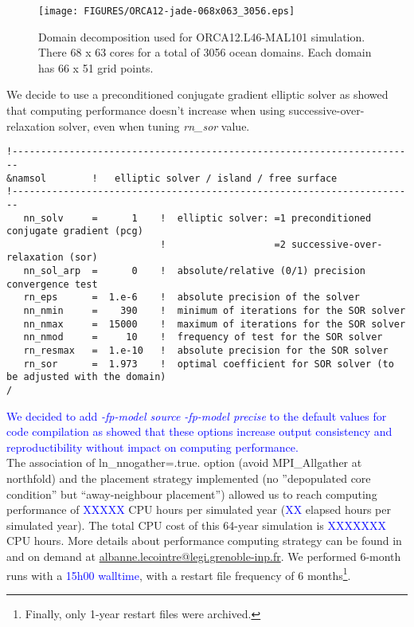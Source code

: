 \normalsize

\begin{figure}[H]
\begin{center}
\texttt{[image: FIGURES/ORCA12-jade-068x063\_3056.eps]}
\caption{Domain decomposition used for ORCA12.L46-MAL101 simulation. There 68 x 63 cores for a total of 3056 ocean domains. Each domain has 66 x 51 grid points.}
\label{decomp}
\end{center}
\end{figure}

We decide to use a preconditioned conjugate gradient elliptic solver as \cite{report_sor} showed that computing performance doesn't increase when 
using successive-over-relaxation solver, even when tuning \textit{rn\_sor} value.

\scriptsize
\begin{verbatim}
!-----------------------------------------------------------------------
&namsol        !   elliptic solver / island / free surface
!-----------------------------------------------------------------------
   nn_solv     =      1    !  elliptic solver: =1 preconditioned conjugate gradient (pcg)
                           !                   =2 successive-over-relaxation (sor)
   nn_sol_arp  =      0    !  absolute/relative (0/1) precision convergence test
   rn_eps      =  1.e-6    !  absolute precision of the solver
   nn_nmin     =    390    !  minimum of iterations for the SOR solver
   nn_nmax     =  15000    !  maximum of iterations for the SOR solver
   nn_nmod     =     10    !  frequency of test for the SOR solver
   rn_resmax   =  1.e-10   !  absolute precision for the SOR solver
   rn_sor      =  1.973    !  optimal coefficient for SOR solver (to be adjusted with the domain)
/
\end{verbatim}

\normalsize

\textcolor{blue}{We decided to add \textit{-fp-model source -fp-model precise} to the default values for code compilation as \cite{Lecointre_perfNEMO3.4} showed that these options 
increase output consistency and reproductibility without impact on computing performance.} \\

The association of ln\_nnogather=.true. option (avoid MPI\_Allgather at northfold) and the placement strategy implemented 
(no ''depopulated core condition'' but ``away-neighbour placement'') allowed 
us to reach computing performance of \textcolor{blue}{XXXXX} CPU hours per simulated year (\textcolor{blue}{XX} elapsed hours per simulated year). 
The total CPU cost of this 64-year simulation is \textcolor{blue}{XXXXXXX} CPU hours. 
More details about performance computing strategy can be found in \cite{Lecointre2011,Lecointre_perfNEMO3.4} and on demand 
at \href{mailto:albanne.lecointre@legi.grenoble-inp.fr}{albanne.lecointre@legi.grenoble-inp.fr}. 
We performed 6-month runs with a \textcolor{blue}{15h00 walltime}, with a restart file frequency 
of 6 months\footnote{Finally, only 1-year restart files were archived.}.

